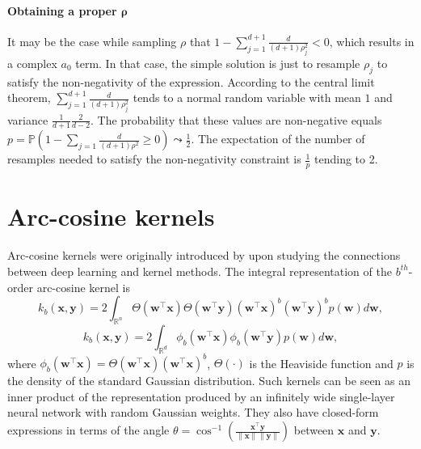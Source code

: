 \paragraph*{Obtaining a proper \texorpdfstring{$\boldsymbol{\rho}$}.}
It may be the case while sampling $\rho$ that $1 - \sum_{j = 1}^{d + 1}\frac{d}{(d + 1)\rho_j^2} < 0$, which results in a complex $a_0$ term. In that case, the simple solution is just to resample $\rho_j$ to satisfy the non-negativity of the expression.
According to the central limit theorem, $\sum_{j = 1}^{d + 1} \frac{d}{(d + 1)\rho_j^2}$ tends to a normal random variable with mean $1$ and variance $\frac{1}{d + 1}\frac{2}{d - 2}$.
The probability that these values are non-negative equals ${p = \mathbb{P}(1 - \sum_{j = 1}\frac{d}{(d + 1)\rho^2} \ge 0) \leadsto \frac12}$.
The expectation of the number of resamples needed to satisfy the non-negativity constraint is $\frac{1}{p}$ tending to 2.


\section{Arc-cosine kernels}
\label{sub:arccos}
Arc-cosine kernels were originally introduced by \citep{cho2009kernel} upon studying the connections between deep learning and kernel methods. The integral representation of the $b^{th}$-order arc-cosine kernel is
\begin{equation*}
k_b(\mathbf{x}, \mathbf{y}) = 2 \int_{\mathbb{R}^n} \Theta(\mathbf{w}^{\boldsymbol{\top}}\mathbf{x})
                                                  \Theta(\mathbf{w}^{\boldsymbol{\top}}\mathbf{y})
                                                  (\mathbf{w}^{\boldsymbol{\top}}\mathbf{x})^b
                                                  (\mathbf{w}^{\boldsymbol{\top}}\mathbf{y})^b
                                                  p(\mathbf{w}) d\mathbf{w},
\end{equation*}
\begin{equation*}
k_b(\mathbf{x}, \mathbf{y}) = 2 \int_{\mathbb{R}^d} \phi_b(\mathbf{w}^{\boldsymbol{\top}}\mathbf{x})
\phi_b(\mathbf{w}^{\boldsymbol{\top}}\mathbf{y}) p(\mathbf{w}) d\mathbf{w},
\end{equation*}
where $\phi_b(\mathbf{w}^{\boldsymbol{\top}}\mathbf{x}) = \Theta(\mathbf{w}^{\boldsymbol{\top}}\mathbf{x}) (\mathbf{w}^{\boldsymbol{\top}}\mathbf{x})^b$, $\Theta(\cdot)$ is the Heaviside function
and $p$ is the density of the standard Gaussian distribution.
Such kernels can be seen as an inner product of the representation produced by an infinitely wide single-layer neural network with random Gaussian weights. They also have closed-form expressions in terms of the angle $\theta = \cos^{-1} \left( \frac{\mathbf{x}^{\boldsymbol{\top}}\mathbf{y}}{\|\mathbf{x}\|\|\mathbf{y}\|} \right)$ between %
$\mathbf{x}$ and $\mathbf{y}$.

